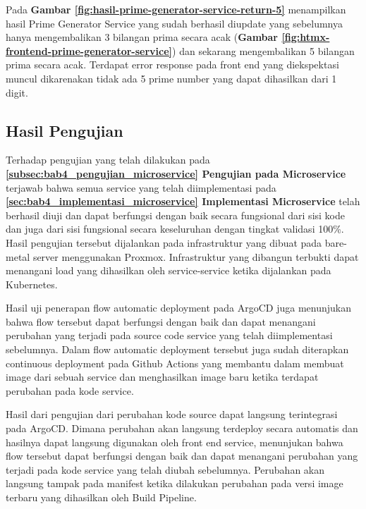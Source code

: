 Pada \textbf{Gambar \ref{fig:hasil-prime-generator-service-return-5}}
menampilkan hasil Prime Generator Service yang sudah berhasil diupdate yang
sebelumnya hanya mengembalikan 3 bilangan prima secara acak (\textbf{Gambar
  \ref{fig:htmx-frontend-prime-generator-service}}) dan sekarang mengembalikan 5
bilangan prima secara acak. Terdapat error response pada front end yang
diekspektasi muncul dikarenakan tidak ada 5 prime number yang dapat dihasilkan
dari 1 digit.

\newpage

\subsection{Hasil Pengujian}\label{subsec:hasil_pengujian}
Terhadap pengujian yang telah dilakukan pada
\textbf{\ref{subsec:bab4_pengujian_microservice} Pengujian pada Microservice}
terjawab bahwa semua service yang telah diimplementasi pada
\textbf{\ref{sec:bab4_implementasi_microservice} Implementasi Microservice}
telah berhasil diuji dan dapat berfungsi dengan baik secara fungsional dari
sisi kode dan juga dari sisi fungsional secara keseluruhan dengan tingkat
validasi 100\%. Hasil pengujian tersebut dijalankan pada infrastruktur yang
dibuat pada bare-metal server menggunakan Proxmox. Infrastruktur yang dibangun
terbukti dapat menangani load yang dihasilkan oleh service-service ketika
dijalankan pada Kubernetes.

Hasil uji penerapan flow automatic deployment pada ArgoCD juga menunjukan bahwa
flow tersebut dapat berfungsi dengan baik dan dapat menangani perubahan yang
terjadi pada source code service yang telah diimplementasi sebelumnya. Dalam
flow automatic deployment tersebut juga sudah diterapkan continuous deployment
pada Github Actions yang membantu dalam membuat image dari sebuah service dan
menghasilkan image baru ketika terdapat perubahan pada kode service.

Hasil dari pengujian dari perubahan kode source dapat langsung terintegrasi
pada ArgoCD. Dimana perubahan akan langsung terdeploy secara automatis dan
hasilnya dapat langsung digunakan oleh front end service, menunjukan bahwa flow
tersebut dapat berfungsi dengan baik dan dapat menangani perubahan yang terjadi
pada kode service yang telah diubah sebelumnya. Perubahan akan langsung tampak
pada manifest ketika dilakukan perubahan pada versi image terbaru yang
dihasilkan oleh Build Pipeline.



